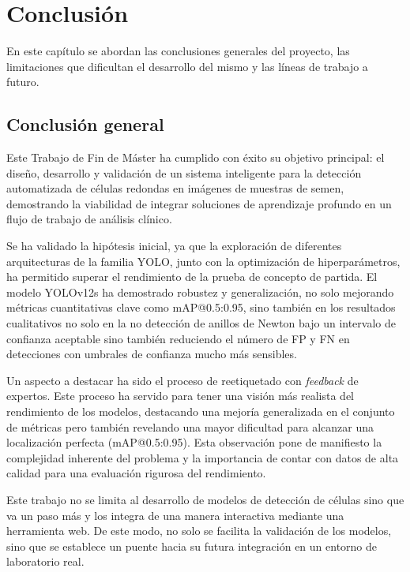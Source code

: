 \documentclass[12pt,a4paper,onecolumn,oneside]{report}
\begin{document}
\chapter{Conclusión} %

En este capítulo se abordan las conclusiones generales del proyecto, las limitaciones que dificultan el desarrollo del mismo y las líneas de trabajo a futuro.

\section{Conclusión general}
\label{sec:Conclusión general}

Este Trabajo de Fin de Máster ha cumplido con éxito su objetivo principal: el diseño, desarrollo y validación de un sistema inteligente para la detección automatizada de células redondas en imágenes de muestras de semen, demostrando 
la viabilidad de integrar soluciones de aprendizaje profundo en un flujo de trabajo de análisis clínico.

Se ha validado la hipótesis inicial, ya que la exploración de diferentes arquitecturas de la familia YOLO, junto con la optimización de hiperparámetros, ha permitido superar el rendimiento de la prueba de concepto de partida. 
El modelo YOLOv12s ha demostrado robustez y generalización, no solo mejorando métricas cuantitativas clave como mAP@0.5:0.95, sino también en los resultados cualitativos no solo en la no detección de anillos de Newton bajo un intervalo de confianza aceptable sino también
reduciendo el número de FP y FN en detecciones con umbrales de confianza mucho más sensibles.  

Un aspecto a destacar ha sido el proceso de reetiquetado con \textit{feedback} de expertos. Este proceso ha servido para tener una visión más realista del rendimiento de los modelos, destacando una mejoría 
generalizada en el conjunto de métricas pero también revelando una mayor dificultad para alcanzar una localización perfecta (mAP@0.5:0.95). Esta observación pone de manifiesto la complejidad inherente 
del problema y la importancia de contar con datos de alta calidad para una evaluación rigurosa del rendimiento.

Este trabajo no se limita al desarrollo de modelos de detección de células sino que va un paso más y los integra de una manera interactiva mediante una herramienta web. 
De este modo, no solo se facilita la validación de los modelos, sino que se establece un puente hacia su futura integración en un entorno de laboratorio real.
\end{document}
